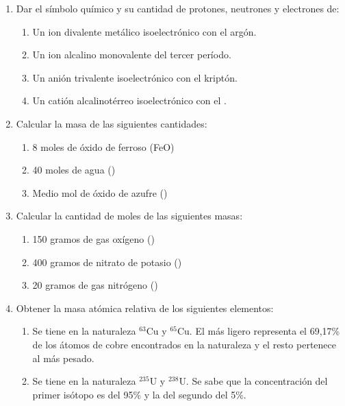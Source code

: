 \begin{enumerate}
\item Dar el símbolo químico y su cantidad de protones, neutrones y electrones de: 
\begin{enumerate}
    \item Un ion divalente metálico isoelectrónico con el argón.

    \item Un ion alcalino monovalente del tercer período.

    \item Un anión trivalente isoelectrónico con el kriptón.

    \item Un catión alcalinotérreo isoelectrónico con el .
\end{enumerate}


\item Calcular la masa de las siguientes cantidades:
\begin{enumerate}
    \item 8 moles de óxido de ferroso (FeO) %

    \item 40 moles de agua () %

    \item Medio mol de óxido de azufre () %
\end{enumerate}


\item Calcular la cantidad de moles de las siguientes masas:
\begin{enumerate}
    \item 150 gramos de gas oxígeno () %

    \item 400 gramos de nitrato de potasio () %

    \item 20 gramos de gas nitrógeno () %
\end{enumerate}


\item Obtener la masa atómica relativa de los siguientes elementos:
\begin{enumerate}
    \item Se tiene en la naturaleza $^{63}$Cu y $^{65}$Cu. El más ligero representa el 69,17\% de los átomos de cobre encontrados en la naturaleza y el resto pertenece al más pesado.

    \item Se tiene en la naturaleza $^{235}$U y $^{238}$U. Se sabe que la concentración del primer isótopo es del 95\% y la del segundo del 5\%.


\end{enumerate}
\end{enumerate}
